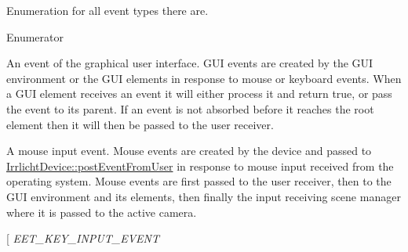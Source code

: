 Enumeration for all event types there are. 

\begin{Desc}
\item[Enumerator]\par
\begin{description}
\item[{\em 
E\+E\+T\+\_\+\+G\+U\+I\+\_\+\+E\+V\+E\+NT\hypertarget{namespaceirr_ac9eed96e06e85ce3c86fcbbbe9e48a0cae85bb44dd09a29c879d64a05047fc1d2}{}\label{namespaceirr_ac9eed96e06e85ce3c86fcbbbe9e48a0cae85bb44dd09a29c879d64a05047fc1d2}
}]An event of the graphical user interface. G\+UI events are created by the G\+UI environment or the G\+UI elements in response to mouse or keyboard events. When a G\+UI element receives an event it will either process it and return true, or pass the event to its parent. If an event is not absorbed before it reaches the root element then it will then be passed to the user receiver. \item[{\em 
E\+E\+T\+\_\+\+M\+O\+U\+S\+E\+\_\+\+I\+N\+P\+U\+T\+\_\+\+E\+V\+E\+NT\hypertarget{namespaceirr_ac9eed96e06e85ce3c86fcbbbe9e48a0caa230b748674e074aa67f661819ad5891}{}\label{namespaceirr_ac9eed96e06e85ce3c86fcbbbe9e48a0caa230b748674e074aa67f661819ad5891}
}]A mouse input event. Mouse events are created by the device and passed to \hyperlink{classirr_1_1IrrlichtDevice_abf859e39f017b0403c6ed331e48e01df}{Irrlicht\+Device\+::post\+Event\+From\+User} in response to mouse input received from the operating system. Mouse events are first passed to the user receiver, then to the G\+UI environment and its elements, then finally the input receiving scene manager where it is passed to the active camera. \item[{\em 
E\+E\+T\+\_\+\+K\+E\+Y\+\_\+\+I\+N\+P\+U\+T\+\_\+\+E\+V\+E\+NT\hypertarget{namespaceirr_ac9eed96e06e85ce3c86fcbbbe9e48a0ca6f90390f3147a1693e5e2e3422d6ca09}{}\label{namespaceirr_ac9eed96e06e85ce3c86fcbbbe9e48a0ca6f90390f3147a1693e5e2e3422d6ca09}
}
\end{description}
\end{Desc}
